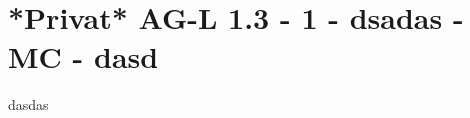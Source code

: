 \section{*Privat* AG-L 1.3 - 1 - dsadas - MC - dasd}

\begin{beispiel}[AG-L 1.3]{1}
dasdas
\end{beispiel}